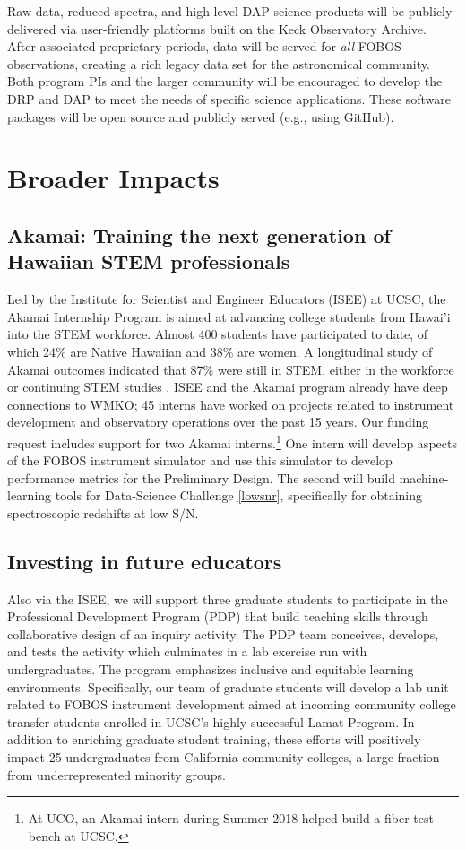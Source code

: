 \documentclass[oneside,11pt]{amsart}
\begin{document}
Raw data, reduced spectra, and high-level DAP science products will be
publicly delivered via user-friendly platforms built on the Keck Observatory Archive.  After associated
proprietary periods, data will be served for {\it all} FOBOS observations, creating a rich legacy data set for the astronomical community.  Both program PIs
and the larger community will be encouraged to develop the DRP and DAP
to meet the needs of specific science applications.  These software
packages will be open source and publicly served (e.g., using GitHub).

\section{Broader Impacts}
\label{sec:bi}

\subsection{Akamai: Training the next generation of Hawaiian STEM
professionals} Led by the Institute for Scientist and Engineer Educators
(ISEE) at UCSC, the Akamai Internship Program is aimed at advancing
college students from Hawai'i into the STEM workforce.  Almost 400
students have participated to date, of which 24\% are Native Hawaiian
and 38\% are women. A longitudinal study of Akamai outcomes indicated
that 87\% were still in STEM, either in the workforce or continuing STEM
studies \citep{asee_peer_31030}.  ISEE and the Akamai program already have deep connections to WMKO; 45 interns have
worked on projects related to instrument
development and observatory operations over the past 15 years.  Our
funding request includes support for two Akamai interns.\footnote{
%
At UCO, an Akamai intern during Summer 2018 helped build a fiber
test-bench at UCSC.}
%
One intern will develop aspects of the FOBOS instrument simulator and use this simulator to develop performance metrics
for the Preliminary Design.  The second will build machine-learning tools for Data-Science Challenge \ref{lowsnr},
specifically for obtaining spectroscopic redshifts at low S/N.


\subsection{Investing in future educators} Also via the ISEE, we will
support three graduate students to participate in the Professional
Development Program (PDP) that build teaching skills through
collaborative design of an inquiry activity.  The PDP team conceives,
develops, and tests the activity which culminates in a lab exercise
run with undergraduates. The program
emphasizes inclusive and equitable learning environments.  Specifically, our team of graduate
students will develop a lab unit related to FOBOS instrument development aimed at
incoming community college transfer students enrolled in UCSC's
highly-successful Lamat Program.  In addition to enriching graduate
student training, these efforts will positively impact 25
undergraduates from California community colleges, a large fraction
from underrepresented minority groups.
\end{document}
